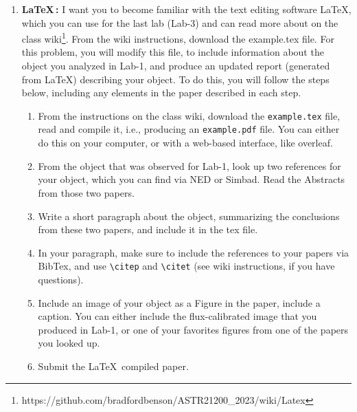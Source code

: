 \documentclass[11pt]{article}
\begin{document}
\begin{enumerate} 
\itemsep 0.5em
\item {\bf \LaTeX\,:} I want you to become familiar with the text editing software \LaTeX, which you can use for the last lab (Lab-3) and can read more about on the class wiki\footnote{https://github.com/bradfordbenson/ASTR21200\_2023/wiki/Latex}.  From the wiki instructions, download the example.tex file.  For this problem, you will modify this file, to include information about the object you analyzed in Lab-1, and produce an updated report (generated from \LaTeX) describing your object.  To do this, you will follow the steps below, including any elements in the paper described in each step. 
\begin{enumerate}[label=(\alph*)]
\item From the instructions on the class wiki, download the \verb|example.tex| file, read and compile it, i.e., producing an \verb|example.pdf| file.  You can either do this on your computer, or with a web-based interface, like overleaf. 
\item From the object that was observed for Lab-1, look up two references for your object, which you can find via NED or Simbad.  Read the Abstracts from those two papers. 
\item Write a short paragraph about the object, summarizing the conclusions from these two papers, and include it in the tex file.    
\item In your paragraph, make sure to include the references to your papers via BibTex, and use \verb|\citep| and \verb|\citet| (see wiki instructions, if you have questions).  
\item Include an image of your object as a Figure in the paper, include a caption.   You can either include the flux-calibrated image that you produced in Lab-1, or one of your favorites figures from one of the papers you looked up.  
\item Submit the \LaTeX\, compiled paper.
\end{enumerate}


\end{enumerate}
\end{document}
